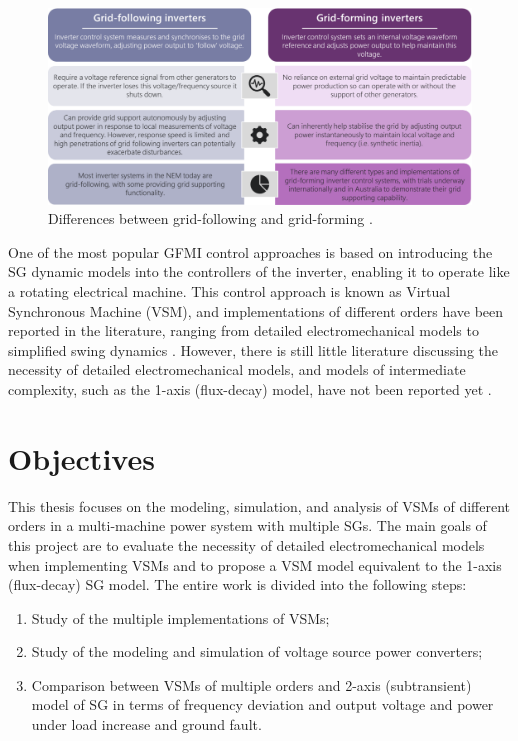 \begin{figure}[h!]
    \centering
    \includegraphics[width=14cm]{images/gfli_vs_gfmi.png}
    \caption{Differences between grid-following and grid-forming
    \cite{taylor2021application}.}
    \label{fig:gfli_vs_gfmi}
\end{figure}

One of the most popular GFMI control approaches is based on introducing the SG
dynamic models into the controllers of the inverter, enabling it to operate like
a rotating electrical machine. This control approach is known as Virtual
Synchronous Machine (VSM), and implementations of different orders have been
reported in the literature, ranging from detailed electromechanical models
\cite{beck2007vsm,zhang2013vsm} to simplified swing dynamics
\cite{zhong2011synchronverter,alipoor2015power}. However, there is still
little literature discussing the necessity of detailed electromechanical models,
and models of intermediate complexity, such as the 1-axis (flux-decay) model,
have not been reported yet \cite{chen2020modeling}.

\section{Objectives}
This thesis focuses on the modeling, simulation, and analysis of VSMs of
different orders in a multi-machine power system with multiple SGs. The main
goals of this project are to evaluate the necessity of detailed
electromechanical models when implementing VSMs and to propose a VSM model
equivalent to the 1-axis (flux-decay) SG model. The entire work is divided into
the following steps:

\begin{enumerate}
    \item Study of the multiple implementations of VSMs; 
    \item Study of the modeling and simulation of voltage source power converters;
    \item Comparison between VSMs of multiple orders and 2-axis (subtransient)
    model of SG in terms of frequency deviation and output voltage and power
    under load increase and ground fault.
\end{enumerate}

